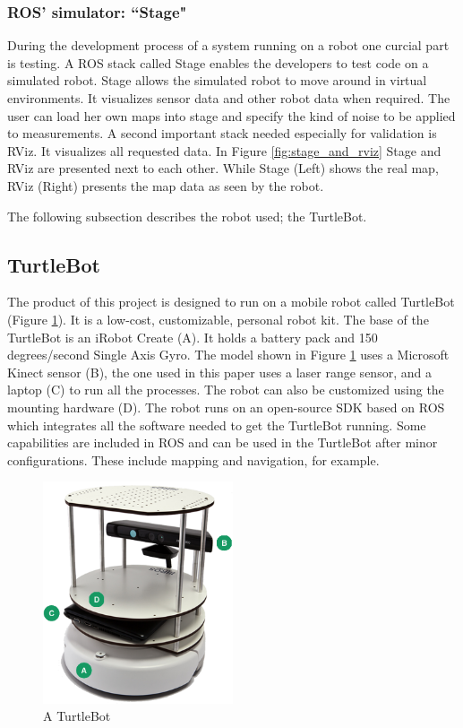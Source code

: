 \documentclass{ba-kecs}
\begin{document}
\subsubsection{ROS' simulator: ``Stage"}
During the development process of a system running on a robot one curcial part is testing. A ROS stack called Stage enables the developers to test code on a simulated robot. Stage allows the simulated robot to move around in virtual environments. It visualizes sensor data and other robot data when required. The user can load her own maps into stage and specify the kind of noise to be applied to measurements. A second important stack needed especially for validation is RViz. It visualizes all requested data. In Figure \ref{fig:stage_and_rviz} Stage and RViz are presented next to each other. While Stage (Left) shows the real map, RViz (Right) presents the map data as seen by the robot.

The following subsection describes the robot used; the TurtleBot.
\subsection{TurtleBot}
\label{subsec:turtle}
The product of this project is designed to run on a mobile robot called TurtleBot (Figure \ref{fig:turtlebot}). It is a low-cost, customizable, personal robot kit. The base of the TurtleBot is an iRobot Create (A). It holds a battery pack and 150 degrees/second Single Axis Gyro. The model shown in Figure \ref{fig:turtlebot} uses a Microsoft Kinect sensor (B), the one used in this paper uses a laser range sensor, and a laptop (C) to run all the processes. The robot can also be customized using the mounting hardware (D). The robot runs on an open-source SDK based on ROS which integrates all the software needed to get the TurtleBot running. Some capabilities are included in ROS and can be used in the TurtleBot after minor configurations. These include mapping and navigation, for example. 
\begin{figure}[h]
	\centering
		\includegraphics[width=0.50\textwidth]{figures/turtlebot.png}
	\caption{A TurtleBot}
	\label{fig:turtlebot}
\end{figure}
\end{document}
